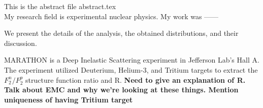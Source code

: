 
This is the abstract file abstract.tex\\

My research field is experimental nuclear physics.  My work was  ------


We present the details of the  analysis, the obtained distributions, and their discussion.

MARATHON is a Deep Inelastic Scattering experiment in Jefferson Lab's Hall A. The experiment utilized Deuterium, Helium-3, and Tritium targets to extract the $F_2^n/F_2^p$ structure function ratio and R. \textbf{Need to give an explanation of R. Talk about EMC and why we're looking at these things. Mention uniqueness of having Tritium target}